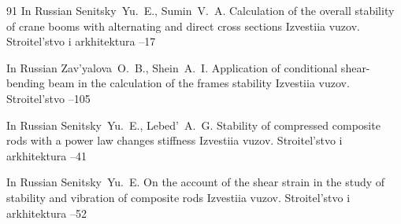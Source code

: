 \begin{thebibliography}{91}
\lang In Russian
\by Senitsky~Yu.~E., Sumin~V.~A.
\paper Calculation of the overall stability of crane booms with alternating and direct cross sections
\jour Izvestiia vuzov. Stroitel'stvo i arkhitektura
--17


\lang In Russian
\by Zav'yalova~O.~B., Shein~A.~I.
\paper Application of conditional shear-bending beam in the calculation of the frames stability 
\jour  Izvestiia vuzov. Stroitel'stvo
--105


\lang In Russian
\by Senitsky~Yu.~E., Lebed'~A.~G.
\paper Stability of compressed composite rods with a power law changes stiffness
\jour Izvestiia vuzov. Stroitel'stvo i arkhitektura
--41


\lang In Russian
\by Senitsky~Yu.~E.
 \paper On the account of the shear strain in the study of stability and vibration of composite rods
  \jour  Izvestiia vuzov. Stroitel'stvo i arkhitektura
  --52

 

\end{thebibliography}

\EngDate


\Russian
\newpage

%
%